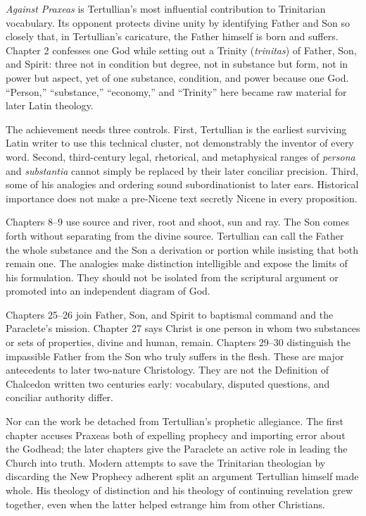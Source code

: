 \emph{Against Praxeas} is Tertullian's most influential contribution to
Trinitarian vocabulary. Its opponent protects divine unity by identifying
Father and Son so closely that, in Tertullian's caricature, the Father himself
is born and suffers. Chapter 2 confesses one God while setting out a Trinity
(\emph{trinitas}) of Father, Son, and Spirit: three not in condition but degree,
not in substance but form, not in power but aspect, yet of one substance,
condition, and power because one God. ``Person,'' ``substance,'' ``economy,''
and ``Trinity'' here became raw material for later Latin theology.

The achievement needs three controls. First, Tertullian is the earliest
surviving Latin writer to use this technical cluster, not demonstrably the
inventor of every word. Second, third-century legal, rhetorical, and
metaphysical ranges of \emph{persona} and \emph{substantia} cannot simply be
replaced by their later conciliar precision. Third, some of his analogies and
ordering sound subordinationist to later ears. Historical importance does not
make a pre-Nicene text secretly Nicene in every proposition.

Chapters 8--9 use source and river, root and shoot, sun and ray. The Son comes
forth without separating from the divine source. Tertullian can call the Father
the whole substance and the Son a derivation or portion while insisting that
both remain one. The analogies make distinction intelligible and expose the
limits of his formulation. They should not be isolated from the scriptural
argument or promoted into an independent diagram of God.

Chapters 25--26 join Father, Son, and Spirit to baptismal command and the
Paraclete's mission. Chapter 27 says Christ is one person in whom two
substances or sets of properties, divine and human, remain. Chapters 29--30
distinguish the impassible Father from the Son who truly suffers in the flesh.
These are major antecedents to later two-nature Christology. They are not the
Definition of Chalcedon written two centuries early: vocabulary, disputed
questions, and conciliar authority differ.

Nor can the work be detached from Tertullian's prophetic allegiance. The first
chapter accuses Praxeas both of expelling prophecy and importing error about the
Godhead; the later chapters give the Paraclete an active role in leading the
Church into truth. Modern attempts to save the Trinitarian theologian by
discarding the New Prophecy adherent split an argument Tertullian himself made
whole. His theology of distinction and his theology of continuing revelation
grew together, even when the latter helped estrange him from other Christians.
